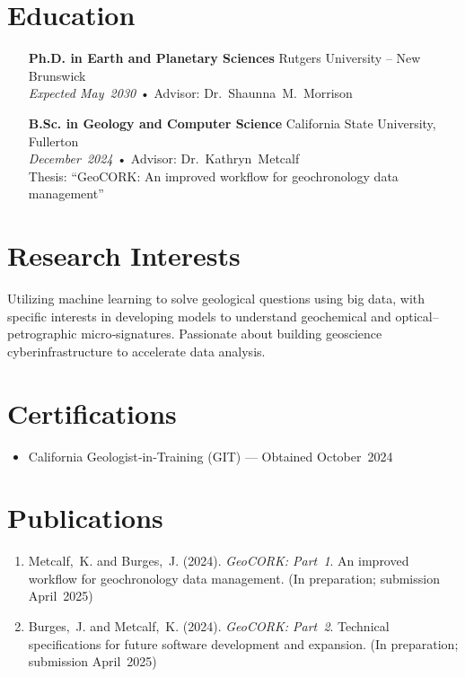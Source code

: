 \documentclass[margin]{res}
\begin{document}
\section{Education}
\begin{itemize}[leftmargin=0.5cm]
  \item[\textbf{Ph.D. in Earth and Planetary Sciences} \hfill Rutgers University – New Brunswick \\]
    \textit{Expected May 2030} • Advisor: Dr.~Shaunna~M.~Morrison
  \item[\textbf{B.Sc. in Geology and Computer Science} \hfill California State University, Fullerton \\]
    \textit{December 2024} • Advisor: Dr.~Kathryn~Metcalf \\ Thesis: ``GeoCORK: An improved workflow for geochronology data management''
\end{itemize}

\section{Research Interests}
Utilizing machine learning to solve geological questions using big data, with specific interests in developing models to understand geochemical and optical–petrographic micro‑signatures. Passionate about building geoscience cyberinfrastructure to accelerate data analysis.

\section{Certifications}
\begin{itemize}[noitemsep]
  \item California Geologist‑in‑Training (GIT) — Obtained October 2024
\end{itemize}

\section{Publications}
\begin{enumerate}[label=\arabic*., leftmargin=0.5cm]
  \item Metcalf, K. and Burges, J. (2024). \textit{GeoCORK: Part 1}. An improved workflow for geochronology data management. (In preparation; submission April 2025)
  \item Burges, J. and Metcalf, K. (2024). \textit{GeoCORK: Part 2}. Technical specifications for future software development and expansion. (In preparation; submission April 2025)
\end{enumerate}
\end{document}
